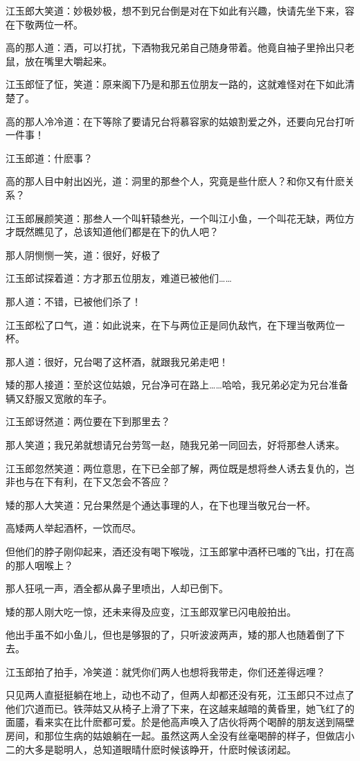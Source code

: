 \documentclass[12pt,oneside]{book}
\begin{document}
江玉郎大笑道：妙极妙极，想不到兄台倒是对在下如此有兴趣，快请先坐下来，容在下敬两位一杯。

高的那人道：酒，可以打扰，下酒物我兄弟自己随身带着。他竟自袖子里拎出只老鼠，放在嘴里大嚼起来。

江玉郎怔了怔，笑道：原来阁下乃是和那五位朋友一路的，这就难怪对在下如此清楚了。

高的那人冷冷道：在下等除了要请兄台将慕容家的姑娘割爱之外，还要向兄台打听一件事！

江玉郎道：什麽事？

高的那人目中射出凶光，道：洞里的那叁个人，究竟是些什麽人？和你又有什麽关系？

江玉郎展颜笑道：那叁人一个叫轩辕叁光，一个叫江小鱼，一个叫花无缺，两位方才既然瞧见了，总该知道他们都是在下的仇人吧？

那人阴恻恻一笑，道：很好，好极了

江玉郎试探着道：方才那五位朋友，难道已被他们\ldots\ldots{}

那人道：不错，已被他们杀了！

江玉郎松了口气，道：如此说来，在下与两位正是同仇敌忾，在下理当敬两位一杯。

那人道：很好，兄台喝了这杯酒，就跟我兄弟走吧！

矮的那人接道：至於这位姑娘，兄台净可在路上\ldots\ldots 哈哈，我兄弟必定为兄台准备辆又舒服又宽敞的车子。

江玉郎讶然道：两位要在下到那里去？

那人笑道；我兄弟就想请兄台劳驾一赵，随我兄弟一同回去，好将那叁人诱来。

江玉郎忽然笑道：两位意思，在下已全部了解，两位既是想将叁人诱去复仇的，岂非也与在下有利，在下又怎会不答应？

矮的那人大笑道：兄台果然是个通达事理的人，在下也理当敬兄台一杯。

高矮两人举起酒杯，一饮而尽。

但他们的脖子刚仰起来，酒还没有喝下喉咙，江玉郎掌中酒杯已嗤的飞出，打在高的那人咽喉上？

那人狂吼一声，酒全都从鼻子里喷出，人却已倒下。

矮的那人刚大吃一惊，还未来得及应变，江玉郎双掌已闪电般拍出。

他出手虽不如小鱼儿，但也是够狠的了，只听波波两声，矮的那人也随着倒了下去。

江玉郎拍了拍手，冷笑道：就凭你们两人也想将我带走，你们还差得远哩？

只见两人直挺挺躺在地上，动也不动了，但两人却都还没有死，江玉郎只不过点了他们穴道而已。铁萍姑又从椅子上滑了下来，在这越来越暗的黄昏里，她飞红了的面靥，看来实在比什麽都可爱。於是他高声唤入了店伙将两个喝醉的朋友送到隔壁房间，和那位生病的姑娘躺在一起。虽然这两人全没有丝毫喝醉的样子，但做店小二的大多是聪明人，总知道眼晴什麽时候该睁开，什麽时候该闭起。
\end{document}
